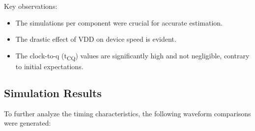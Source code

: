 \documentclass[a4paper,12pt]{article}
\begin{document}
Key observations:
\begin{itemize}
    \item The simulations per component were crucial for accurate estimation.
    \item The drastic effect of VDD on device speed is evident.
    \item The clock-to-q (t\textsubscript{CQ}) values are significantly high and not negligible, contrary to initial expectations.
\end{itemize}

\subsection{Simulation Results}
To further analyze the timing characteristics, the following waveform comparisons were generated:
\end{document}
